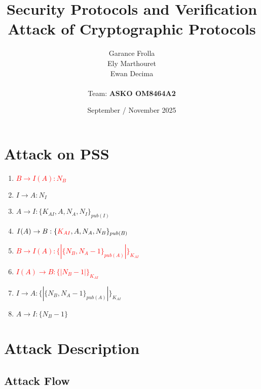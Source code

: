 \documentclass[11pt]{article}
\begin{document}
    \title{
            { \textbf{Security Protocols and Verification}} \\[1ex]
        {\small Attack of Cryptographic Protocols}
    }


    \author{
        Garance Frolla \\
        Ely Marthouret \\
        Ewan Decima\\ \\
        Team: \textbf{ASKO OM8464A2}
    }

    \date{September / November 2025}


    \maketitle
    \tableofcontents
    \newpage



    \section{Attack on PSS}

    \begin{enumerate}
        \item \textcolor{red}{$B \rightarrow I(A) : N_B$}
        \item $I \rightarrow A : N_I$
        \item $A \rightarrow I : \{K_{AI}, A, N_A, N_I\}_{pub(I)}$
        \item \textcolor{red}{$I(A) \rightarrow B : \{\textcolor{red}{K_{AI}}, A, N_A, N_B\}_{pub(B)}$}
        \item \textcolor{red}{$B \rightarrow I(A) : \{|\{N_B, N_A -1\}_{pub(A)}|\}_{K_{AI}}$}
        \item \textcolor{red}{$I(A) \rightarrow B : \{|N_B-1|\}_{K_{AI}}$}
        \item $I \rightarrow A : \{| \{N_B, N_A-1\}_{pub(A)} |\}_{K_{AI}}$
        \item $A \rightarrow I : \{N_B-1\}$
    \end{enumerate}

    \section{Attack Description}
    \subsection{Attack Flow}
\end{document}
